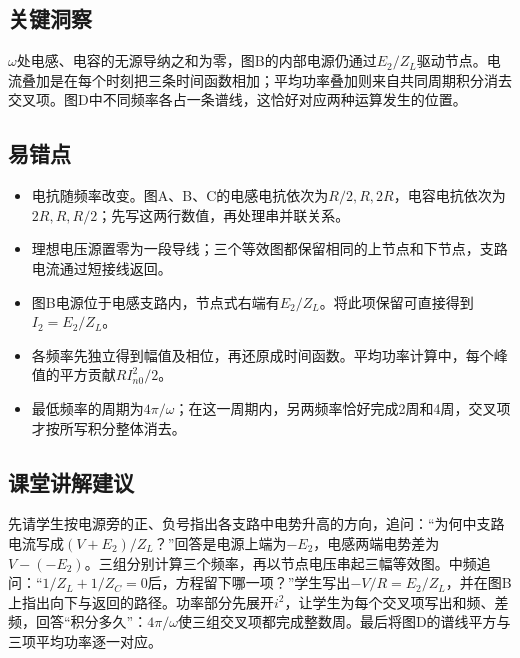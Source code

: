 \documentclass[UTF8,fontset=fandol,a4paper,11pt]{ctexart}
\begin{document}


\subsection*{关键洞察}

$\omega$处电感、电容的无源导纳之和为零，图B的内部电源仍通过$E_2/Z_L$驱动节点。电流叠加是在每个时刻把三条时间函数相加；平均功率叠加则来自共同周期积分消去交叉项。图D中不同频率各占一条谱线，这恰好对应两种运算发生的位置。



\subsection*{易错点}

\begin{itemize}
\item 电抗随频率改变。图A、B、C的电感电抗依次为$R/2,R,2R$，电容电抗依次为$2R,R,R/2$；先写这两行数值，再处理串并联关系。
\item 理想电压源置零为一段导线；三个等效图都保留相同的上节点和下节点，支路电流通过短接线返回。
\item 图B电源位于电感支路内，节点式右端有$E_2/Z_L$。将此项保留可直接得到$I_2=E_2/Z_L$。
\item 各频率先独立得到幅值及相位，再还原成时间函数。平均功率计算中，每个峰值的平方贡献$RI_{n0}^2/2$。
\item 最低频率的周期为$4\pi/\omega$；在这一周期内，另两频率恰好完成2周和4周，交叉项才按所写积分整体消去。
\end{itemize}



\subsection*{课堂讲解建议}

先请学生按电源旁的正、负号指出各支路中电势升高的方向，追问：“为何中支路电流写成$(V+E_2)/Z_L$？”回答是电源上端为$-E_2$，电感两端电势差为$V-(-E_2)$。三组分别计算三个频率，再以节点电压串起三幅等效图。中频追问：“$1/Z_L+1/Z_C=0$后，方程留下哪一项？”学生写出$-V/R=E_2/Z_L$，并在图B上指出向下与返回的路径。功率部分先展开$i^2$，让学生为每个交叉项写出和频、差频，回答“积分多久”：$4\pi/\omega$使三组交叉项都完成整数周。最后将图D的谱线平方与三项平均功率逐一对应。
\end{document}
